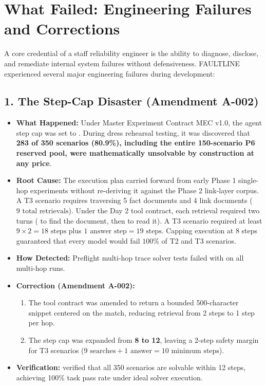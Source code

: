 \section{What Failed: Engineering Failures and Corrections}

A core credential of a staff reliability engineer is the ability to diagnose, disclose, and remediate internal system failures without defensiveness. FAULTLINE experienced several major engineering failures during development:

\subsection{1. The Step-Cap Disaster (Amendment A-002)}
\begin{itemize}
    \item \textbf{What Happened:} Under Master Experiment Contract MEC v1.0, the agent step cap was set to . During dress rehearsal testing, it was discovered that \textbf{283 of 350 scenarios (80.9\%), including the entire 150-scenario P6 reserved pool, were mathematically unsolvable by construction at any price}.
    \item \textbf{Root Cause:} The execution plan carried  forward from early Phase 1 single-hop experiments without re-deriving it against the Phase 2 link-layer corpus. A T3 scenario requires traversing 5 fact documents and 4 link documents ($9\text{ total retrievals}$). Under the Day 2 tool contract, each retrieval required two turns ( to find the document, then  to read it). A T3 scenario required at least $9 \times 2 = 18\text{ steps}$ plus $1\text{ answer step} = 19\text{ steps}$. Capping execution at 8 steps guaranteed that every model would fail $100\%$ of T2 and T3 scenarios.
    \item \textbf{How Detected:} Preflight multi-hop trace solver tests failed with  on all multi-hop runs.
    \item \textbf{Correction (Amendment A-002):} 
    \begin{enumerate}
        \item The  tool contract was amended to return a bounded 500-character snippet centered on the match, reducing retrieval from 2 steps to 1 step per hop.
        \item The step cap was expanded from \textbf{8 to 12}, leaving a 2-step safety margin for T3 scenarios ($9\text{ searches} + 1\text{ answer} = 10\text{ minimum steps}$).
    \end{enumerate}
    \item \textbf{Verification:}  verified that all 350 scenarios are solvable within 12 steps, achieving 100\% task pass rate under ideal solver execution.
\end{itemize}

